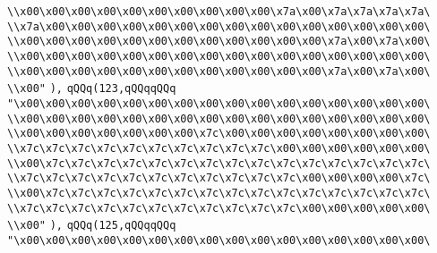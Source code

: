 \verb|\\x00\x00\x00\x00\x00\x00\x00\x00\x00\x00\x7a\x00\x7a\x7a\x7a\x7a\|\newline
\verb|\\x7a\x00\x00\x00\x00\x00\x00\x00\x00\x00\x00\x00\x00\x00\x00\x00\|\newline
\verb|\\x00\x00\x00\x00\x00\x00\x00\x00\x00\x00\x00\x00\x7a\x00\x7a\x00\|\newline
\verb|\\x00\x00\x00\x00\x00\x00\x00\x00\x00\x00\x00\x00\x00\x00\x00\x00\|\newline
\verb|\\x00\x00\x00\x00\x00\x00\x00\x00\x00\x00\x00\x00\x7a\x00\x7a\x00\|\newline
\verb|\\x00"|\newline
\verb|),|\newline
\verb|qQQq(123,qQQqqQQq|\newline
\verb|"\x00\x00\x00\x00\x00\x00\x00\x00\x00\x00\x00\x00\x00\x00\x00\x00\|\newline
\verb|\\x00\x00\x00\x00\x00\x00\x00\x00\x00\x00\x00\x00\x00\x00\x00\x00\|\newline
\verb|\\x00\x00\x00\x00\x00\x00\x00\x7c\x00\x00\x00\x00\x00\x00\x00\x00\|\newline
\verb|\\x7c\x7c\x7c\x7c\x7c\x7c\x7c\x7c\x7c\x7c\x00\x00\x00\x00\x00\x00\|\newline
\verb|\\x00\x7c\x7c\x7c\x7c\x7c\x7c\x7c\x7c\x7c\x7c\x7c\x7c\x7c\x7c\x7c\|\newline
\verb|\\x7c\x7c\x7c\x7c\x7c\x7c\x7c\x7c\x7c\x7c\x7c\x00\x00\x00\x00\x7c\|\newline
\verb|\\x00\x7c\x7c\x7c\x7c\x7c\x7c\x7c\x7c\x7c\x7c\x7c\x7c\x7c\x7c\x7c\|\newline
\verb|\\x7c\x7c\x7c\x7c\x7c\x7c\x7c\x7c\x7c\x7c\x7c\x00\x00\x00\x00\x00\|\newline
\verb|\\x00"|\newline
\verb|),|\newline
\verb|qQQq(125,qQQqqQQq|\newline
\verb|"\x00\x00\x00\x00\x00\x00\x00\x00\x00\x00\x00\x00\x00\x00\x00\x00\|\newline
